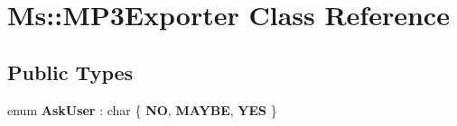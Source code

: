 \hypertarget{class_ms_1_1_m_p3_exporter}{}\section{Ms\+:\+:M\+P3\+Exporter Class Reference}
\label{class_ms_1_1_m_p3_exporter}
\subsection*{Public Types}
\begin{DoxyCompactItemize}
\item 
\mbox{\label{class_ms_1_1_m_p3_exporter_adb55bd6b80eace63a88e248a3b5608b0}} 
enum {\bfseries Ask\+User} \+: char \{ {\bfseries NO}, 
{\bfseries M\+A\+Y\+BE}, 
{\bfseries Y\+ES}
 \}
\end{DoxyCompactItemize}
